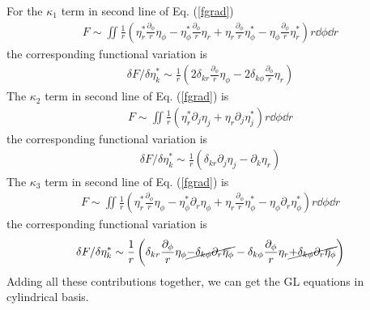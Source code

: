 \documentclass[aps,prl,preprint]{revtex4-2}
\begin{document}
For the $\kappa_1$ term in second line of Eq. (\ref{fgrad})
\begin{align}
    F\sim\iint\frac{1}{r}\left(
    \eta_r^*\frac{\partial_\phi}{r}\eta_\phi
    -\eta_\phi^*\frac{\partial_\phi}{r}\eta_r
    + \eta_r\frac{\partial_\phi}{r}\eta_\phi^*
    -\eta_\phi\frac{\partial_\phi}{r}\eta_r^*
    \right)r\dd\phi\dd r
\end{align}
the corresponding functional variation is
\begin{align}
    \delta F/\delta\eta_k^*\sim\frac{1}{r}\left(
    2\delta_{kr}\frac{\partial_\phi}{r}\eta_\phi - 2\delta_{k\phi}\frac{\partial_\phi}{r}\eta_r\right)
\end{align}
The $\kappa_2$ term in second line of Eq. (\ref{fgrad}) is
\begin{align}
    F\sim\iint\frac{1}{r}\left(
    \eta_r^*\partial_j\eta_j + \eta_r\partial_j\eta_j^*
    \right)r\dd\phi\dd r
\end{align}
the corresponding functional variation is
\begin{align}
    \delta F/\delta\eta_k^*\sim\frac{1}{r}\left(
    \delta_{kr}\partial_j\eta_j - \partial_k\eta_r\right)
\end{align}
The $\kappa_3$ term in second line of Eq. (\ref{fgrad}) is
\begin{align}
    F\sim\iint\frac{1}{r}\left(
    \eta_r^*\frac{\partial_\phi}{r}\eta_\phi - \eta_\phi^*\partial_r\eta_\phi
    + \eta_r\frac{\partial_\phi}{r}\eta_\phi^* - \eta_\phi\partial_r\eta_\phi^*
    \right)r\dd\phi\dd r
\end{align}
the corresponding functional variation is
\begin{align}
    \delta F/\delta\eta_k^*\sim\frac{1}{r}\left(
    \delta_{kr}\frac{\partial_\phi}{r}\eta_\phi
    \cancel{- \delta_{k\phi}\partial_r\eta_\phi}
    - \delta_{k\phi}\frac{\partial_\phi}{r}\eta_r
    \cancel{+ \delta_{k\phi}\partial_r\eta_\phi}\right)
\end{align}
Adding all these contributions together, we can get the GL equations in cylindrical basis.
\end{document}
